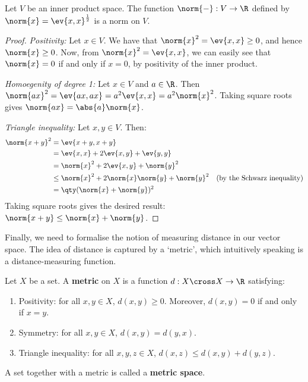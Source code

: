 \begin{theorem}
  Let \( V \) be an inner product space. The function \( \norm{-}:V\to\R \) defined by \( \norm{x}=\ev{x,x}^{\frac{1}{2}} \) is a norm on \( V \).
\end{theorem}
\begin{proof}
  \emph{Positivity:} Let \( x\in V \). We have that \( \norm{x}^2=\ev{x,x}\geq 0 \), and hence \( \norm{x}\geq 0 \). Now, from \( \norm{x}^2=\ev{x,x} \), we can easily see that \( \norm{x}=0 \) if and only if \( x=0 \), by positivity of the inner product.

  \vspace{3mm}

  \emph{Homoegenity of degree 1:} Let \( x\in V \) and \( a\in\R \). Then \( \norm{ax}^2=\ev{ax,ax}=a^2\ev{x,x}=a^2\norm{x}^2 \). Taking square roots gives \( \norm{ax}=\abs{a}\norm{x} \).

  \vspace{3mm}

  \emph{Triangle inequality:} Let \( x,y\in V \). Then:
  \begin{align*}
    \norm{x+y}^2&= \ev{x+y,x+y}\\
    &= \ev{x,x}+2\ev{x,y}+\ev{y,y}\\
    &= \norm{x}^2+2\ev{x,y}+\norm{y}^2\\
    &\leq \norm{x}^2+2\norm{x}\norm{y}+\norm{y}^2 &(\text{by the Schwarz inequality})\\
    &= \qty(\norm{x}+\norm{y})^2
  \end{align*}
  Taking square roots gives the desired result: \( \norm{x+y}\leq\norm{x}+\norm{y} \).
\end{proof}

Finally, we need to formalise the notion of measuring distance in our vector space. The idea of distance is captured by a `metric', which intuitively speaking is a distance-measuring function.

\begin{definition}
  Let \( X \) be a set. A \textbf{metric} on \( X \) is a function \( d:X\cross X\to\R \) satisfying:
  \begin{enumerate}[label=(\alph*)]
  \item Positivity: for all \( x,y\in X \), \( d(x,y)\geq 0 \). Moreover, \( d(x,y)=0 \) if and only if \( x=y \).
  \item Symmetry: for all \( x,y\in X\), \( d(x,y)=d(y,x) \).
  \item Triangle inequality: for all \( x,y,z\in X \), \( d(x,z)\leq d(x,y)+d(y,z) \).
  \end{enumerate}
  A set together with a metric is called a \textbf{metric space}.
\end{definition}

